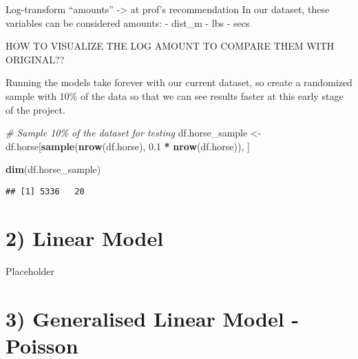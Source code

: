\documentclass[
]{article}
\newenvironment{Shaded}{\begin{snugshade}}{\end{snugshade}}
\newcommand{\CommentTok}[1]{\textcolor[rgb]{0.56,0.35,0.01}{\textit{#1}}}
\newcommand{\FloatTok}[1]{\textcolor[rgb]{0.00,0.00,0.81}{#1}}
\newcommand{\FunctionTok}[1]{\textcolor[rgb]{0.13,0.29,0.53}{\textbf{#1}}}
\newcommand{\NormalTok}[1]{#1}
\newcommand{\OtherTok}[1]{\textcolor[rgb]{0.56,0.35,0.01}{#1}}
\newcommand{\SpecialCharTok}[1]{\textcolor[rgb]{0.81,0.36,0.00}{\textbf{#1}}}
\begin{document}
Log-transform ``amounts'' -\textgreater{} at prof's recommendation In
our dataset, these variables can be considered amounts: - dist\_m - lbs
- secs

\begin{Shaded}
\end{Shaded}

HOW TO VISUALIZE THE LOG AMOUNT TO COMPARE THEM WITH ORIGINAL??

Running the models take forever with our current dataset, so create a
randomized sample with 10\% of the data so that we can see results
faster at this early stage of the project.

\begin{Shaded}
\begin{Highlighting}[]
\CommentTok{\# Sample 10\% of the dataset for testing}
\NormalTok{df.horse\_sample }\OtherTok{\textless{}{-}}\NormalTok{ df.horse[}\FunctionTok{sample}\NormalTok{(}\FunctionTok{nrow}\NormalTok{(df.horse), }\FloatTok{0.1} \SpecialCharTok{*} \FunctionTok{nrow}\NormalTok{(df.horse)), ]}

\FunctionTok{dim}\NormalTok{(df.horse\_sample)}
\end{Highlighting}
\end{Shaded}

\begin{verbatim}
## [1] 5336   20
\end{verbatim}

\section{2) Linear Model}\label{linear-model}

Placeholder

\section{3) Generalised Linear Model -
Poisson}\label{generalised-linear-model---poisson}
\end{document}

